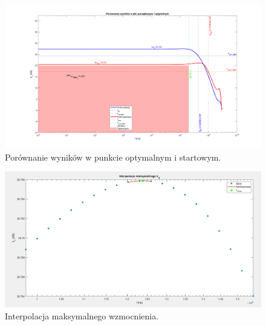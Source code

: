 \documentclass{article}
\begin{document}
\pagebreak
\begin{landscape}
	\begin{figure}[h]
		\vspace*{-2cm}
		\includegraphics[width=25cm,height=15 cm]{graphics/comparison.png}
		\centering
		\caption{Porównanie wyników w punkcie optymalnym i startowym.}
	\end{figure}
\end{landscape}


\pagebreak
\begin{landscape}
	\begin{figure}[h]
		\vspace*{-2cm}
		\includegraphics[width=20cm,height=10 cm]{graphics/max_ku_interp.png}
		\centering
		\caption{Interpolacja maksymalnego wzmocnienia.}
	\end{figure}
\end{landscape}
\end{document}
